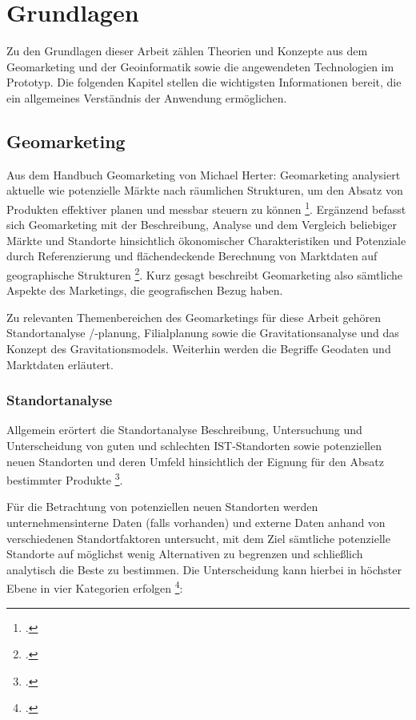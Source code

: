 \chapter{Grundlagen}
Zu den Grundlagen dieser Arbeit zählen Theorien und Konzepte aus dem Geomarketing und der Geoinformatik sowie die angewendeten Technologien im Prototyp.
Die folgenden Kapitel stellen die wichtigsten Informationen bereit, die ein allgemeines Verständnis der Anwendung ermöglichen.

\section{Geomarketing}
Aus dem Handbuch Geomarketing von Michael Herter: 
Geomarketing analysiert aktuelle wie potenzielle Märkte nach räumlichen Strukturen, um den Absatz von Produkten effektiver planen und messbar steuern zu können \footcite{herter_handbuch_2018}.
Ergänzend befasst sich Geomarketing mit der Beschreibung, Analyse und dem Vergleich beliebiger Märkte und Standorte hinsichtlich ökonomischer Charakteristiken und Potenziale durch Referenzierung und flächendeckende Berechnung von Marktdaten auf geographische Strukturen \footcite{geomarketing_def}.
Kurz gesagt beschreibt Geomarketing also sämtliche Aspekte des Marketings, die geografischen Bezug haben.

Zu relevanten Themenbereichen des Geomarketings für diese Arbeit gehören Standortanalyse /-planung, Filialplanung sowie die Gravitationsanalyse und das Konzept des Gravitationsmodels.
Weiterhin werden die Begriffe Geodaten und Marktdaten erläutert.

\subsection{Standortanalyse}
Allgemein erörtert die Standortanalyse Beschreibung, Untersuchung und Unterscheidung von guten und schlechten IST-Standorten sowie potenziellen neuen Standorten und deren Umfeld hinsichtlich der Eignung für den Absatz bestimmter Produkte \footcite{geomarketing_standortanalyse}.

Für die Betrachtung von potenziellen neuen Standorten werden unternehmensinterne Daten (falls vorhanden) und externe Daten anhand von verschiedenen Standortfaktoren untersucht, mit dem Ziel sämtliche potenzielle Standorte auf möglichst wenig Alternativen zu begrenzen und schließlich analytisch die Beste zu bestimmen. 
Die Unterscheidung kann hierbei in höchster Ebene in vier Kategorien erfolgen \footcite{haas_standortfaktoren}:

